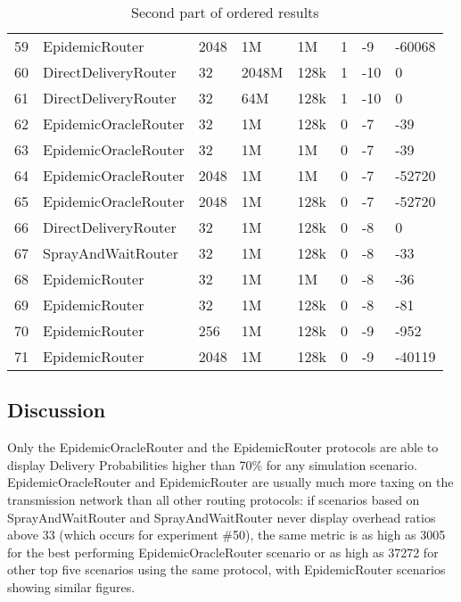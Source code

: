 \begin{table}[htpb]
\begin{tabular}{@{}p{}p{}p{}p{}p{}p{}p{}p{}@{}}
59 & EpidemicRouter & 2048 & 1M & 1M & 1 & -9 & -60068 \\
60 & DirectDeliveryRouter & 32 & 2048M & 128k & 1 & -10 & 0 \\
61 & DirectDeliveryRouter & 32 & 64M & 128k & 1 & -10 & 0 \\
62 & EpidemicOracleRouter & 32 & 1M & 128k & 0 & -7 & -39 \\
63 & EpidemicOracleRouter & 32 & 1M & 1M & 0 & -7 & -39 \\
64 & EpidemicOracleRouter & 2048 & 1M & 1M & 0 & -7 & -52720 \\
65 & EpidemicOracleRouter & 2048 & 1M & 128k & 0 & -7 & -52720 \\
66 & DirectDeliveryRouter & 32 & 1M & 128k & 0 & -8 & 0 \\
67 & SprayAndWaitRouter & 32 & 1M & 128k & 0 & -8 & -33 \\
68 & EpidemicRouter & 32 & 1M & 1M & 0 & -8 & -36 \\
69 & EpidemicRouter & 32 & 1M & 128k & 0 & -8 & -81 \\
70 & EpidemicRouter & 256 & 1M & 128k & 0 & -9 & -952 \\
71 & EpidemicRouter & 2048 & 1M & 128k & 0 & -9 & -40119 \\ \bottomrule
\end{tabular}
\caption{Second part of ordered results}
\label{tab:res2}
\end{table}

\subsection{Discussion}

Only the EpidemicOracleRouter and the EpidemicRouter protocols are able to
display Delivery Probabilities higher than 70\% for any simulation scenario.
EpidemicOracleRouter and EpidemicRouter are usually much more taxing on the
transmission network than all other routing protocols: if scenarios based on
SprayAndWaitRouter and SprayAndWaitRouter never display overhead ratios above
33 (which occurs for experiment \#50), the same metric is as high as 3005 for the
best performing EpidemicOracleRouter scenario or as high as 37272 for other
top five scenarios using the same protocol, with EpidemicRouter scenarios
showing similar figures.

